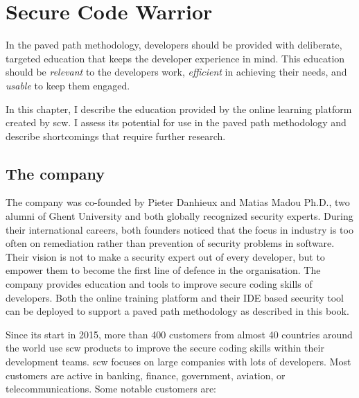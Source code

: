 \chapter{Secure Code Warrior}
\label{ch:scw}
\glsresetall

In the paved path methodology, developers should be provided with deliberate, targeted education that keeps the developer experience in mind.
This education should be \textit{relevant} to the developers work, \textit{efficient} in achieving their needs, and \textit{usable} to keep them engaged.

In this chapter, I describe the education provided by the online learning platform created by \gls{scw}. 
I assess its potential for use in the paved path methodology and describe shortcomings that require further research.


\clearpage

\section{The company}
The company was co-founded by Pieter Danhieux and Matias Madou Ph.D., two alumni of Ghent University and both globally recognized security experts.
During their international careers, both founders noticed that the focus in industry is too often on remediation rather than prevention of \glspl{security problem} in software.
Their vision is not to make a security expert out of every developer, but to empower them to become the first line of defence in the organisation.
The company provides education and tools to improve secure coding skills of developers.
Both the online training platform and their IDE based security tool can be deployed to support a paved path methodology as described in this book.

Since its start in 2015, more than 400 customers from almost 40 countries around the world use \gls{scw} products to improve the secure coding skills within their development teams.
\Gls{scw} focuses on large companies with lots of developers. Most customers are active in banking, finance, government, aviation, or telecommunications. Some notable customers are:

